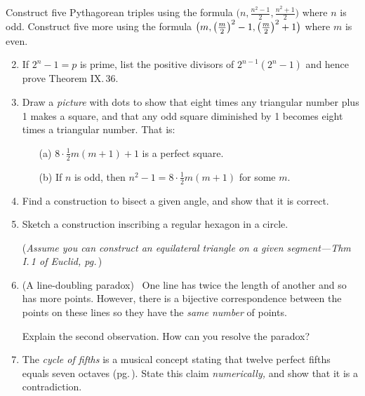 \begin{exercises}{}{}
\exstart %
Construct five Pythagorean triples using the formula $\bigl(n,\frac{n^2-1}2,\frac{n^2+1}2\bigr)$ where $n$ is odd. Construct five more using the formula $\bigl(m,\left(\frac{m}{2}\right)^2-1,\left(\frac{m}{2}\right)^2+1\bigr)$ where $m$ is even.%

\begin{enumerate}\setcounter{enumi}{1}
  \item If $2^n-1=p$ is prime, list the positive divisors of $2^{n-1}(2^n-1)$ and hence prove Theorem IX.\,36.
  
  \item%
  Draw a \emph{picture} with dots to show that eight times any triangular number plus 1 makes a square, and that any odd square diminished by 1 becomes eight times a triangular number. That is:
  \begin{enumerate}
    \item[(a)] $8\cdot\frac 12m(m+1)+1$ is a perfect square.
    \item[(b)] If $n$ is odd, then $n^2-1=8\cdot\frac 12m(m+1)$ for some $m$.
  \end{enumerate}
  
  \item%
  Find a construction to bisect a given angle, and show that it is correct.
 
  
  \item%
  Sketch a construction inscribing a regular hexagon in a circle.\par
  (\emph{Assume you can construct an equilateral triangle on a given segment---Thm I.\,1 of Euclid, pg.\,\pageref{pg:euclidI1}})
  
	\item (A line-doubling paradox) \ One line has twice the length of another and so has more points. However, there is a bijective correspondence between the points on these lines so they have the \emph{same number} of points.\par
	Explain the second observation. How can you resolve the paradox?


	\item The \emph{cycle of fifths} is a musical concept stating that twelve perfect fifths equals seven octaves (pg.\,\pageref{pg:pythagtuning}). State this claim \emph{numerically,} and show that it is a contradiction.%
  

\end{enumerate}
\end{exercises}
